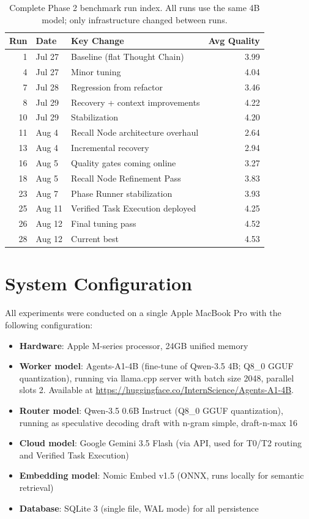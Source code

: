 \documentclass{article}
\begin{document}
\begin{table}[h]
\centering
\small
\begin{tabular}{@{}rllr@{}}
\toprule
\textbf{Run} & \textbf{Date} & \textbf{Key Change} & \textbf{Avg Quality} \\
\midrule
1 & Jul 27 & Baseline (flat Thought Chain) & 3.99 \\
4 & Jul 27 & Minor tuning & 4.04 \\
7 & Jul 28 & Regression from refactor & 3.46 \\
8 & Jul 29 & Recovery + context improvements & 4.22 \\
10 & Jul 29 & Stabilization & 4.20 \\
\midrule
11 & Aug 4 & Recall Node architecture overhaul & 2.64 \\
13 & Aug 4 & Incremental recovery & 2.94 \\
16 & Aug 5 & Quality gates coming online & 3.27 \\
18 & Aug 5 & Recall Node Refinement Pass & 3.83 \\
\midrule
23 & Aug 7 & Phase Runner stabilization & 3.93 \\
25 & Aug 11 & Verified Task Execution deployed & 4.25 \\
26 & Aug 12 & Final tuning pass & 4.52 \\
28 & Aug 12 & Current best & 4.53 \\
\bottomrule
\end{tabular}
\caption{Complete Phase 2 benchmark run index. All runs use the same 4B model; only infrastructure changed between runs.}
\label{tab:run_index}
\end{table}

\section{System Configuration}
\label{app:system_config}

All experiments were conducted on a single Apple MacBook Pro with the following configuration:

\begin{itemize}[leftmargin=*]
\item \textbf{Hardware}: Apple M-series processor, 24GB unified memory
\item \textbf{Worker model}: Agents-A1-4B (fine-tune of Qwen-3.5 4B; Q8\_0 GGUF quantization), running via llama.cpp server with batch size 2048, parallel slots 2. Available at \url{https://huggingface.co/InternScience/Agents-A1-4B}.
\item \textbf{Router model}: Qwen-3.5 0.6B Instruct (Q8\_0 GGUF quantization), running as speculative decoding draft with n-gram simple, draft-n-max 16
\item \textbf{Cloud model}: Google Gemini 3.5 Flash (via API, used for T0/T2 routing and Verified Task Execution)
\item \textbf{Embedding model}: Nomic Embed v1.5 (ONNX, runs locally for semantic retrieval)
\item \textbf{Database}: SQLite 3 (single file, WAL mode) for all persistence
\end{itemize}
\end{document}
